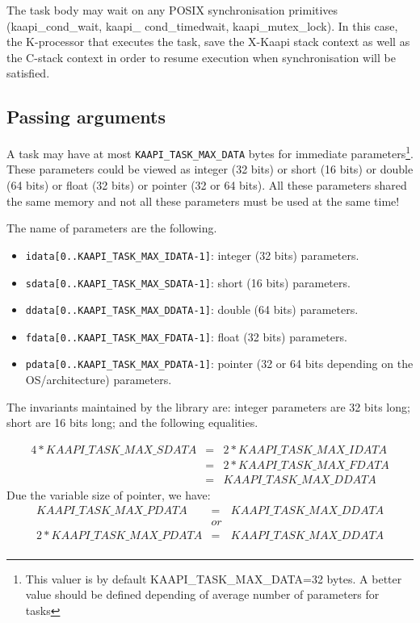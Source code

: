 \documentclass[12pt]{report}
\newcommand{\kaapi}{\textsc{X}-Kaapi\xspace}
\begin{document}
The task body may wait on any POSIX synchronisation primitives (kaapi\_cond\_wait, kaapi\_ cond\_timedwait, kaapi\_mutex\_lock). In this case, the K-processor that executes the task, save the \kaapi stack context as well as the C-stack context in order to resume execution when synchronisation will be satisfied.

\subsection{Passing arguments} \label{sec:param}

A task may have at most \verb+KAAPI_TASK_MAX_DATA+ bytes for immediate parameters\footnote{This valuer is by default KAAPI\_TASK\_MAX\_DATA=32 bytes. A better value should be defined depending of average number of parameters for tasks}. These parameters could be viewed as integer (32 bits) or short (16 bits) or double (64 bits) or float (32 bits) or pointer (32 or 64 bits). All these parameters shared the same memory and not all these parameters must be used at the same time!

The name of parameters are the following.
\begin{itemize}
\item \verb+idata[0..KAAPI_TASK_MAX_IDATA-1]+: integer (32 bits) parameters.
\item \verb+sdata[0..KAAPI_TASK_MAX_SDATA-1]+: short (16 bits) parameters.
\item \verb+ddata[0..KAAPI_TASK_MAX_DDATA-1]+: double (64 bits) parameters.
\item \verb+fdata[0..KAAPI_TASK_MAX_FDATA-1]+: float (32 bits) parameters.
\item \verb+pdata[0..KAAPI_TASK_MAX_PDATA-1]+: pointer (32 or 64 bits depending on the OS/architecture) parameters.
\end{itemize}

The invariants maintained by the library are: integer parameters are 32 bits long; short are 16 bits long;  and the following equalities.
\begin{small}
$$
\begin{array}{ccc}
4 * KAAPI\_TASK\_MAX\_SDATA &   = & 2 * KAAPI\_TASK\_MAX\_IDATA \\
 & = & 2 * KAAPI\_TASK\_MAX\_FDATA \\
 & = &  KAAPI\_TASK\_MAX\_DDATA
\end{array}
$$
Due the variable size of pointer, we have:
$$ 
\begin{array}{ccc}
KAAPI\_TASK\_MAX\_PDATA &   = &  KAAPI\_TASK\_MAX\_DDATA \\
 & or &\\
2*KAAPI\_TASK\_MAX\_PDATA &   = &  KAAPI\_TASK\_MAX\_DDATA \\
\end{array}
$$
\end{small}
\end{document}
